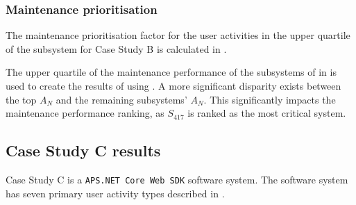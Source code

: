 \clearpage

\subsubsection{Maintenance prioritisation}
The maintenance prioritisation factor for the user activities in the upper quartile of the subsystem for Case Study B is calculated in .



The upper quartile of the maintenance performance of the subsystems of  in  is used to create the results of  using . A more significant disparity exists between the top $A_N$ and the remaining subsystems' $A_N$. This significantly impacts the maintenance performance ranking, as $S_{417}$ is ranked as the most critical system.

\clearpage

\subsection{Case Study C results}\label{sec:ch3_csC}
Case Study C is a \texttt{APS.NET Core Web SDK} software system. The software system has seven primary user activity types described in .

